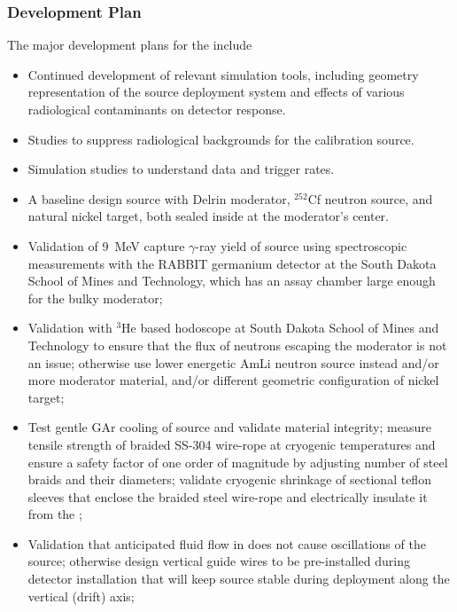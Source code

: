 \subsubsection{Development Plan}
The major development plans for the  include
\begin{itemize}
\item Continued development of relevant simulation tools, including geometry representation of the source deployment system and effects of various radiological contaminants on detector response. 
\item Studies to suppress radiological backgrounds for the calibration source.
\item Simulation studies to understand data and trigger rates.
\item A baseline design source with Delrin moderator, $^{252}$Cf neutron source, and natural nickel target, both sealed inside at the moderator's center.
\item Validation of \SI{9}{\MeV} capture $\gamma$-ray yield of source using spectroscopic measurements with the RABBIT germanium detector at the South Dakota School of Mines and Technology, which has an assay chamber large enough for the bulky moderator; 
\item Validation with $^{3}$He based hodoscope at South Dakota School of Mines and Technology to ensure that the flux of neutrons escaping the moderator is not an issue; otherwise use lower energetic AmLi neutron source instead and/or more moderator material, and/or different geometric configuration of nickel target; 
\item Test gentle GAr cooling of source and validate material integrity; measure tensile strength of braided SS-304 wire-rope at cryogenic temperatures and ensure a safety factor of one order of magnitude by adjusting number of steel braids and their diameters; validate cryogenic shrinkage of sectional teflon sleeves that enclose the braided steel wire-rope and electrically insulate it from the ; 
\item Validation that anticipated fluid flow in  does not cause oscillations of the source; otherwise design vertical guide wires to be pre-installed during detector installation 
that will keep source stable during deployment along the vertical (drift) axis;

\end{itemize}

